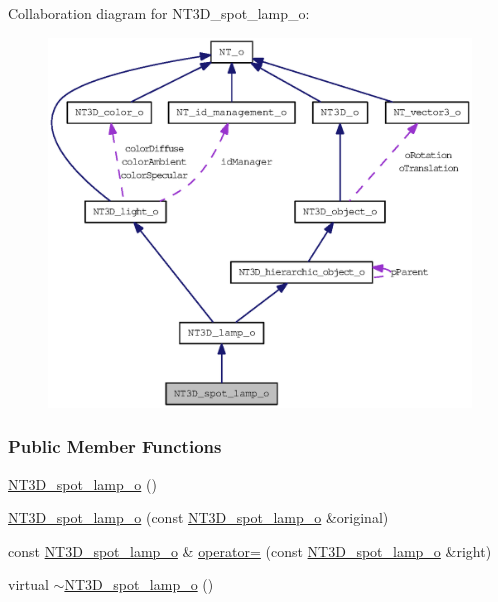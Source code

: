 Collaboration diagram for NT3D\_\-spot\_\-lamp\_\-o:
\nopagebreak
\begin{figure}[H]
\begin{center}
\leavevmode
\includegraphics[width=400pt]{class_n_t3_d__spot__lamp__o__coll__graph}
\end{center}
\end{figure}
\subsubsection*{Public Member Functions}
\begin{DoxyCompactItemize}
\item 
\hyperlink{class_n_t3_d__spot__lamp__o_a52152a72a53d538285dced78232409f8}{NT3D\_\-spot\_\-lamp\_\-o} ()
\item 
\hyperlink{class_n_t3_d__spot__lamp__o_af52a6cd064e5d2119c39249944b168d4}{NT3D\_\-spot\_\-lamp\_\-o} (const \hyperlink{class_n_t3_d__spot__lamp__o}{NT3D\_\-spot\_\-lamp\_\-o} \&original)
\item 
const \hyperlink{class_n_t3_d__spot__lamp__o}{NT3D\_\-spot\_\-lamp\_\-o} \& \hyperlink{class_n_t3_d__spot__lamp__o_accd07152ea53c54681f63742688edc90}{operator=} (const \hyperlink{class_n_t3_d__spot__lamp__o}{NT3D\_\-spot\_\-lamp\_\-o} \&right)
\item 
virtual \hyperlink{class_n_t3_d__spot__lamp__o_a3c4db70e9f39ab1141d4df1800d8943d}{$\sim$NT3D\_\-spot\_\-lamp\_\-o} ()
\end{DoxyCompactItemize}
